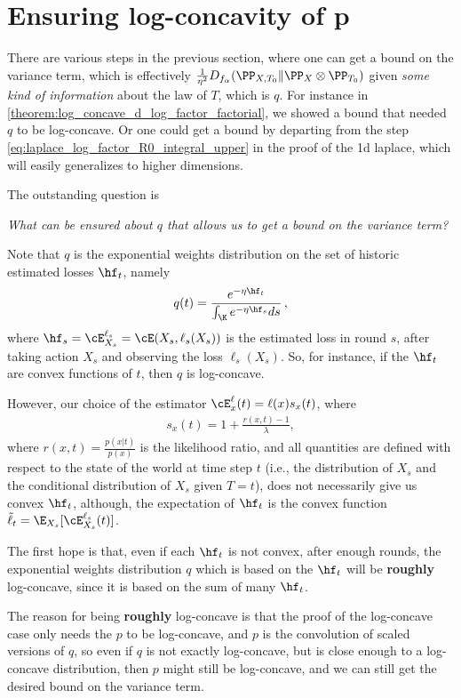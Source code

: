 


\newpage
\section{Ensuring log-concavity of p}
There are various steps in the previous section, where one can get a bound on the variance term, which is effectively $\frac{1}{\eta^2}D_{f_\alpha}(\PP_{X,T_0}\|\PP_X\otimes\PP_{T_0})$ given \textit{some kind of information} about the law of $T$, which is $q$.
For instance in \cref{theorem:log_concave_d_log_factor_factorial}, we showed a bound that needed $q$ to be log-concave.
Or one could get a bound by departing from the step \cref{eq:laplace_log_factor_R0_integral_upper} in the proof of the 1d laplace, which will easily generalizes to higher dimensions.

The outstanding question is
\begin{center}
    \textit{What can be ensured about $q$ that allows us to get a bound on the variance term?}
\end{center}
Note that $q$ is the exponential weights distribution on the set of historic estimated losses $\hf_t$, namely
\begin{align}
    q(t) = \frac{e^{-\eta \hf_t}}{\int_\K e^{-\eta \hf_s} ds}\,,
\end{align}
where $\hf_s = \cE_{X_s}^{\ell_s} = \cE(X_s, \ell_s(X_s))$ is the estimated loss in round $s$,
after taking action $X_s$ and observing the loss $\ell_s(X_s)$.
So, for instance, if the $\hf_t$ are convex functions of $t$, then $q$ is log-concave.

However, our choice of the estimator $\cE_x^\ell(t) = \ell(x) s_x(t)$, where
\begin{align}
    s_x(t) = 1 + \frac{r(x,t) - 1}{\lambda},
\end{align}
where $r(x,t) = \frac{p(x|t)}{p(x)}$ is the likelihood ratio, and all quantities are defined with respect to the state of the world at time step $t$ (i.e., the distribution of $X_s$ and the conditional distribution of $X_s$ given $T=t$), does not necessarily give us convex $\hf_t$, although, the expectation of $\hf_t$ is the convex function $\tilde{\ell}_t = \E_{X_s}[\cE_{X_s}^{\ell_s}(t)]$.

The first hope is that, even if each $\hf_t$ is not convex, after enough rounds, the exponential weights distribution $q$ which is based on the $\hf_t$ will be \textbf{roughly} log-concave, since it is based on the sum of many $\hf_t$.

The reason for being \textbf{roughly} log-concave is that the proof of the log-concave case only needs the $p$ to be log-concave, and $p$ is the convolution of scaled versions of $q$, so even if $q$ is not exactly log-concave, but is close enough to a log-concave distribution, then $p$ might still be log-concave, and we can still get the desired bound on the variance term.

